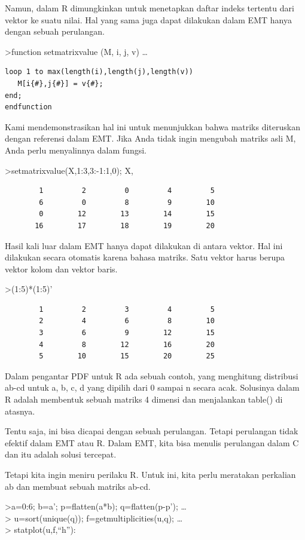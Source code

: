 \documentclass[
]{book}
\begin{document}
Namun, dalam R dimungkinkan untuk menetapkan daftar indeks tertentu dari vektor ke suatu nilai. Hal yang sama juga dapat dilakukan dalam EMT hanya dengan sebuah perulangan.

\textgreater function setmatrixvalue (M, i, j, v) \ldots{}

\begin{verbatim}
loop 1 to max(length(i),length(j),length(v))
   M[i{#},j{#}] = v{#};
end;
endfunction
\end{verbatim}

Kami mendemonstrasikan hal ini untuk menunjukkan bahwa matriks diteruskan dengan referensi dalam EMT. Jika Anda tidak ingin mengubah matriks asli M, Anda perlu menyalinnya dalam fungsi.

\textgreater setmatrixvalue(X,1:3,3:-1:1,0); X,

\begin{verbatim}
        1         2         0         4         5 
        6         0         8         9        10 
        0        12        13        14        15 
       16        17        18        19        20 
\end{verbatim}

Hasil kali luar dalam EMT hanya dapat dilakukan di antara vektor. Hal ini dilakukan secara otomatis karena bahasa matriks. Satu vektor harus berupa vektor kolom dan vektor baris.

\textgreater(1:5)*(1:5)'

\begin{verbatim}
        1         2         3         4         5 
        2         4         6         8        10 
        3         6         9        12        15 
        4         8        12        16        20 
        5        10        15        20        25 
\end{verbatim}

Dalam pengantar PDF untuk R ada sebuah contoh, yang menghitung distribusi ab-cd untuk a, b, c, d yang dipilih dari 0 sampai n secara acak. Solusinya dalam R adalah membentuk sebuah matriks 4 dimensi dan menjalankan table() di atasnya.

Tentu saja, ini bisa dicapai dengan sebuah perulangan. Tetapi perulangan tidak efektif dalam EMT atau R. Dalam EMT, kita bisa menulis perulangan dalam C dan itu adalah solusi tercepat.

Tetapi kita ingin meniru perilaku R. Untuk ini, kita perlu meratakan perkalian ab dan membuat sebuah matriks ab-cd.

\textgreater a=0:6; b=a'; p=flatten(a*b); q=flatten(p-p'); \ldots{}\\
\textgreater{} u=sort(unique(q)); f=getmultiplicities(u,q); \ldots{}\\
\textgreater{} statplot(u,f,``h''):
\end{document}
